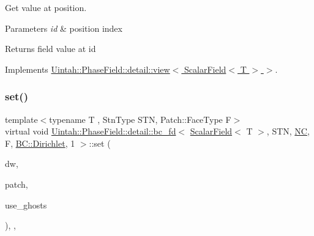 Get value at position. 


\begin{DoxyParams}{Parameters}
{\em id} & position index \\
\hline
\end{DoxyParams}
\begin{DoxyReturn}{Returns}
field value at id 
\end{DoxyReturn}


Implements \hyperlink{classUintah_1_1PhaseField_1_1detail_1_1view_3_01ScalarField_3_01T_01_4_01_4_aea43cfedfe3b6f3c038ff795caec49b8}{Uintah\+::\+Phase\+Field\+::detail\+::view$<$ Scalar\+Field$<$ T $>$ $>$}.

\mbox{\label{classUintah_1_1PhaseField_1_1detail_1_1bc__fd_3_01ScalarField_3_01T_01_4_00_01STN_00_01NC_00_01Fc8a6e28ffa258d282d0a921216b0ed9f_a88a1002b012e8aefe6109f263cadf2d7}} 
\subsubsection{\texorpdfstring{set()}{set()}\hspace{0.1cm}{\footnotesize\ttfamily [1/2]}}
{\footnotesize\ttfamily template$<$typename T , Stn\+Type S\+TN, Patch\+::\+Face\+Type F$>$ \\
virtual void \hyperlink{classUintah_1_1PhaseField_1_1detail_1_1bc__fd}{Uintah\+::\+Phase\+Field\+::detail\+::bc\+\_\+fd}$<$ \hyperlink{structUintah_1_1PhaseField_1_1ScalarField}{Scalar\+Field}$<$ T $>$, S\+TN, \hyperlink{namespaceUintah_1_1PhaseField_a33d355affda78a83f45755ba8388cedda77924170fe82bfd58b74ca3e44139718}{NC}, F, \hyperlink{namespaceUintah_1_1PhaseField_a148fba372aa3be96fd6eede7a2fa10b5abac152b762896edff34ed668ae1a546f}{B\+C\+::\+Dirichlet}, 1 $>$\+::set (\begin{DoxyParamCaption}\item[{Data\+Warehouse $\ast$}]{dw,  }\item[{const Patch $\ast$}]{patch,  }\item[{bool}]{use\+\_\+ghosts }\end{DoxyParamCaption})\hspace{0.3cm}{\ttfamily [inline]}, {\ttfamily [override]}, {\ttfamily [virtual]}}



